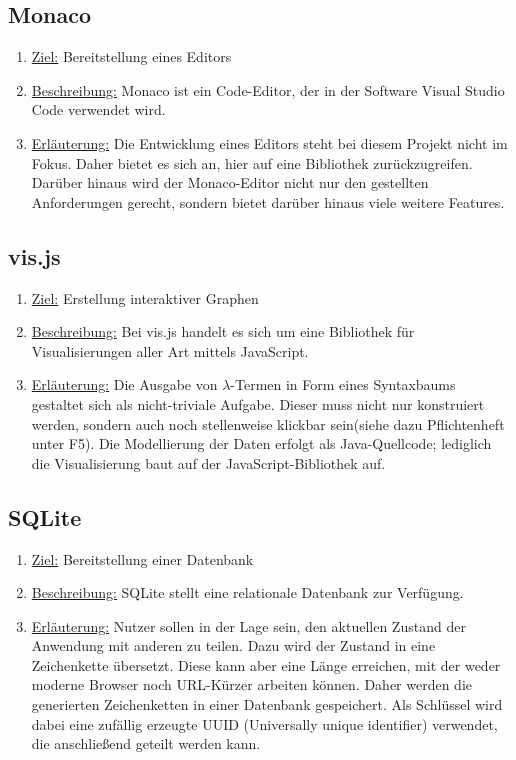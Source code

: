 \documentclass[parskip=full,11pt,twoside]{scrartcl}
\begin{document}
\subsection{Monaco}
\begin{enumerate}
\item \underline{Ziel:} Bereitstellung eines Editors 
\item \underline{Beschreibung:} Monaco ist ein Code-Editor, der in der Software Visual Studio Code verwendet wird.
\item \underline{Erläuterung:} Die Entwicklung eines Editors steht bei diesem Projekt nicht im Fokus. 
Daher bietet es sich an, hier auf eine Bibliothek zurückzugreifen.
Darüber hinaus wird der Monaco-Editor nicht nur den gestellten Anforderungen gerecht, sondern bietet darüber hinaus viele weitere Features.
\end{enumerate}

\subsection{vis.js}
\begin{enumerate}
\item \underline{Ziel:} Erstellung interaktiver Graphen 
\item \underline{Beschreibung:} Bei vis.js handelt es sich um eine Bibliothek für Visualisierungen aller Art mittels JavaScript.
\item \underline{Erläuterung:} Die Ausgabe von $\lambda$-Termen in Form eines Syntaxbaums gestaltet sich als nicht-triviale Aufgabe.
Dieser muss nicht nur konstruiert werden, sondern auch noch stellenweise klickbar sein(siehe dazu Pflichtenheft unter F5).
Die Modellierung der Daten erfolgt als Java-Quellcode; lediglich die Visualisierung baut auf der JavaScript-Bibliothek auf.
\end{enumerate}

\subsection{SQLite}
\begin{enumerate}
\item \underline{Ziel:} Bereitstellung einer Datenbank 
\item \underline{Beschreibung:} SQLite stellt eine relationale Datenbank zur Verfügung.
\item \underline{Erläuterung:} Nutzer sollen in der Lage sein, den aktuellen Zustand der Anwendung mit anderen zu teilen.
Dazu wird der Zustand in eine Zeichenkette übersetzt.
Diese kann aber eine Länge erreichen, mit der weder moderne Browser noch URL-Kürzer arbeiten können.
Daher werden die generierten Zeichenketten in einer Datenbank gespeichert.
Als Schlüssel wird dabei eine zufällig erzeugte UUID (Universally unique identifier) verwendet, die anschließend geteilt werden kann.
\end{enumerate}
\end{document}
